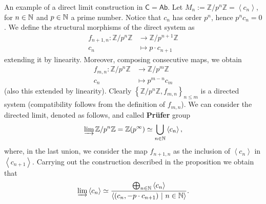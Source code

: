 \begin{ex}
	An example of a direct limit construction in $\mathsf{C} = \mathsf{Ab}$.
	Let $M_n := \mathbb{Z}/p^n\mathbb{Z} = \left\langle c_n \right\rangle$, for $n \in \mathbb{N}$ and $p \in \mathbb{N}$ a prime number.
	Notice that $c_n$ has order $p^n$, hence $p^n c_n = 0$.
	We define the structural morphisms of the direct system as
	\begin{align}
		f_{n+1, n}: \mathbb{Z}/p^n\mathbb{Z} &\to \mathbb{Z}/p^{n+1}\mathbb{Z} \\
		c_n &\mapsto p \cdot c_{n+1}
	\end{align} 
	extending it by linearity.
	Moreover, composing consecutive maps, we obtain
	\begin{align}
		f_{m, n}: \mathbb{Z}/p^n\mathbb{Z} &\to \mathbb{Z}/p^m\mathbb{Z} \\
		c_n &\mapsto p^{m-n} c_m
	\end{align} 
	(also this extended by linearity).
	Clearly $\left\{ \mathbb{Z}/p^n\mathbb{Z}, f_{m,n} \right\}_{n \leq m}$ is a directed system 
	(compatibility follows from the definition of $f_{m,n}$).
	We can consider the directed limit, denoted as follows, and called \textbf{Prüfer} group
	\begin{equation}
		\varinjlim \mathbb{Z}/p^n\mathbb{Z} = \mathbb{Z} (p^{\infty}) \simeq \bigcup_{n \in \mathbb{N}} \left\langle c_n \right\rangle
	,\end{equation} 
	where, in the last union, we consider the map $f_{n+1, n}$ as the inclusion of $\left\langle c_n \right\rangle$ in
	$\left\langle c_{n+1} \right\rangle$.
	Carrying out the construction described in the proposition we obtain that
	\begin{equation}
	\varinjlim \left\langle c_n \right\rangle \simeq
	\frac{\bigoplus_{n \in \mathbb{N}} \left\langle c_n \right\rangle}{\left\langle (c_n, -p \cdot c_{n+1}) \ \middle|\ n \in \mathbb{N} \right\rangle}
	.\end{equation} 
\end{ex} 

